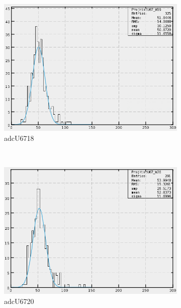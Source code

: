 \begin{figure}[h]
\begin{subfigure}[h]{0.3\textwidth}
        \includegraphics[width=\textwidth, keepaspectratio = true]{adcU67_19}
        \caption{adcU6718}
        \label{fig:adcU67_18}
    \end{subfigure}
    \\
    \begin{subfigure}[h]{0.3\textwidth}
        \centering
        \includegraphics[width=\textwidth, keepaspectratio = true]{adcU67_20}
        \caption{adcU6720}
        \label{fig:adcU67_20}
    \end{subfigure}
    ~
    \begin{subfigure}[h]{0.3\textwidth}
        \centering

\end{subfigure}
\end{figure}

